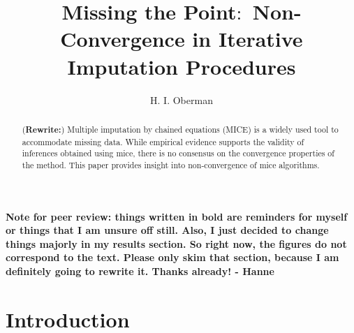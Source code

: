 \documentclass[Royal,times,sageh]{sagej}
\begin{document}
\title{Missing the Point\(\colon\) Non-Convergence in Iterative Imputation
Procedures}


\author{H. I. Oberman}




\begin{abstract}
(\textbf{Rewrite:}) Multiple imputation by chained equations (MICE) is a
widely used tool to accommodate missing data. While empirical evidence
supports the validity of inferences obtained using mice, there is no
consensus on the convergence properties of the method. This paper
provides insight into non-convergence of mice algorithms.
\end{abstract}


\maketitle

\textbf{Note for peer review: things written in bold are reminders for
myself or things that I am unsure off still. Also, I just decided to
change things majorly in my results section. So right now, the figures
do not correspond to the text. Please only skim that section, because I
am definitely going to rewrite it. Thanks already! - Hanne}

\hypertarget{introduction}{%
\section{Introduction}\label{introduction}}
\end{document}
